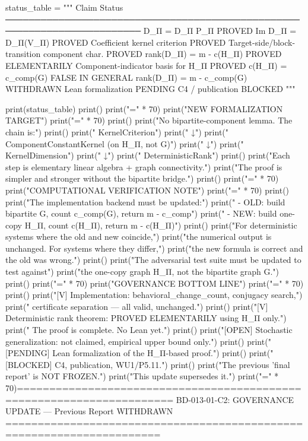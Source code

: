status_table = """
Claim                                           Status
─────────────────────────────────────────────────────────────────────────
D_Π = D_Π P_Π                                   PROVED
Im D_Π = D_Π(V_Π)                               PROVED
Coefficient kernel criterion                      PROVED
Target-side/block-transition component char.      PROVED
rank(D_Π) = m - c(H_Π)                          PROVED ELEMENTARILY
Component-indicator basis for H_Π                 PROVED
c(H_Π) = c_comp(G)                              FALSE IN GENERAL
rank(D_Π) = m - c_comp(G)                       WITHDRAWN
Lean formalization                                PENDING
C4 / publication                                  BLOCKED
"""

print(status_table)
print()
print("=" * 70)
print("NEW FORMALIZATION TARGET")
print("=" * 70)
print()
print("No bipartite-component lemma. The chain is:")
print()
print("  KernelCriterion")
print("       ↓")
print("  ComponentConstantKernel  (on H_Π, not G)")
print("       ↓")
print("  KernelDimension")
print("       ↓")
print("  DeterministicRank")
print()
print("Each step is elementary linear algebra + graph connectivity.")
print("The proof is simpler and stronger without the bipartite bridge.")
print()
print("=" * 70)
print("COMPUTATIONAL VERIFICATION NOTE")
print("=" * 70)
print()
print("The implementation backend must be updated:")
print("  - OLD: build bipartite G, count c_comp(G), return m - c_comp")
print("  - NEW: build one-copy H_Π, count c(H_Π), return m - c(H_Π)")
print()
print("For deterministic systems where the old and new coincide,")
print("the numerical output is unchanged. For systems where they differ,")
print("the new formula is correct and the old was wrong.")
print()
print("The adversarial test suite must be updated to test against")
print("the one-copy graph H_Π, not the bipartite graph G.")
print()
print("=" * 70)
print("GOVERNANCE BOTTOM LINE")
print("=" * 70)
print()
print("[V]  Implementation: behavioral_change_count, conjugacy search,")
print("     certificate separation — all valid, unchanged.")
print()
print("[V]  Deterministic rank theorem: PROVED ELEMENTARILY using H_Π only.")
print("     The proof is complete. No Lean yet.")
print()
print("[OPEN]  Stochastic generalization: not claimed, empirical upper bound only.")
print()
print("[PENDING]  Lean formalization of the H_Π-based proof.")
print()
print("[BLOCKED]  C4, publication, WU1/P5.11.")
print()
print("The previous 'final report' is NOT FROZEN.")
print("This update supersedes it.")
print("=" * 70)======================================================================
BD-013-01-C2: GOVERNANCE UPDATE — Previous Report WITHDRAWN
======================================================================

